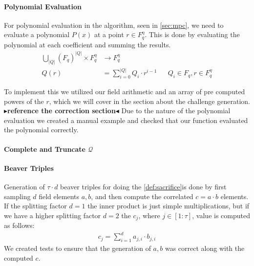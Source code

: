 \documentclass[11pt]{report}
\theoremstyle{definition}
\theoremstyle{plain}
\newcommand{\todo}[1]{{\color[rgb]{.5,0,0}\textbf{$\blacktriangleright$#1$\blacktriangleleft$}}}
\begin{document}
\paragraph{Polynomial Evaluation}
For polynomial evaluation in the algorithm, seen in \autoref{sec:mpc}, we need to evaluate a polynomial $P(x)$ at a point $r \in F_q^\eta$. This is done by evaluating the polynomial at each coefficient and summing the results. 
\begin{align}
  \textstyle\bigcup_{|Q|}(F_q)^{|Q|} \times F_q^\eta & \rightarrow F_q^\eta                 \nonumber                                                    \\
  Q(r)                                               & = \textstyle\sum_{i=0}^{|Q|} Q_i \cdot r^{i-1} &  & Q_i \in F_q, r \in F_q^\eta\label{eq:mpcpoly}
\end{align}

To implement this we utilized our field arithmetic and an array of pre computed powers of the $r$, which we will cover in the section about the challenge generation. \todo{reference the correction section}
Due to the nature of the polynomial evaluation we created a manual example and checked that our function evaluated the polynomial correctly.

\paragraph{Complete and Truncate $\mathcal{Q}$}


\paragraph{Beaver Triples}
Generation of $\tau \cdot d$ beaver triples for doing the \autoref{def:sacrifice}is done by first sampling $d$ field elements $a,b$, and then compute the correlated $c = a \cdot b$ elements. If the splitting factor $d=1$ the inner product is just simple multiplications, but if we have a higher splitting factor $d=2$ the $c_j$, where $j \in [1:\tau]$, value is computed as follows:
\begin{align}
  c_j = \sum_{i=1}^{d} a_{ j,i } \cdot b_{j,i}
\end{align}
We created tests to ensure that the generation of $a,b$ was correct along with the computed $c$.
\end{document}

